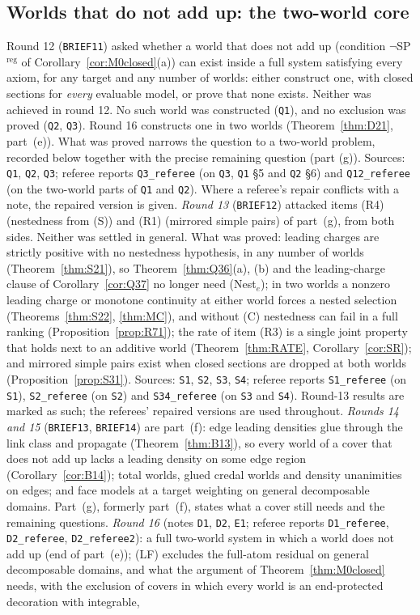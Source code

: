 \documentclass[11pt]{article}
\theoremstyle{definition}
\theoremstyle{remark}
\newcommand{\src}[1]{\texttt{#1}}
\begin{document}
\subsection{Worlds that do not add up: the two-world core}\label{sec:open-core}
Round 12 (\src{BRIEF11}) asked whether a world that does not add up (condition $\neg$SP$^{\mathrm{reg}}$ of Corollary~\ref{cor:M0closed}(a)) can exist inside a full system satisfying every axiom, for any target and any number of worlds: either construct one, with closed sections for \emph{every} evaluable model, or prove that none exists. Neither was achieved in round 12. No such world was constructed (\src{Q1}), and no exclusion was proved (\src{Q2}, \src{Q3}). Round 16 constructs one in two worlds (Theorem~\ref{thm:D21}, part~(e)). What was proved narrows the question to a two-world problem, recorded below together with the precise remaining question (part (g)). Sources: \src{Q1}, \src{Q2}, \src{Q3}; referee reports \src{Q3\_referee} (on \src{Q3}, \src{Q1} \S5 and \src{Q2} \S6) and \src{Q12\_referee} (on the two-world parts of \src{Q1} and \src{Q2}). Where a referee's repair conflicts with a note, the repaired version is given. \emph{Round 13} (\src{BRIEF12}) attacked items (R4) (nestedness from (S)) and (R1) (mirrored simple pairs) of part~(g), from both sides. Neither was settled in general. What was proved: leading charges are strictly positive with no nestedness hypothesis, in any number of worlds (Theorem~\ref{thm:S21}), so Theorem~\ref{thm:Q36}(a), (b) and the leading-charge clause of Corollary~\ref{cor:Q37} no longer need (Nest$_e$); in two worlds a nonzero leading charge or monotone continuity at either world forces a nested selection (Theorems~\ref{thm:S22}, \ref{thm:MC}), and without (C) nestedness can fail in a full ranking (Proposition~\ref{prop:R71}); the rate of item (R3) is a single joint property that holds next to an additive world (Theorem~\ref{thm:RATE}, Corollary~\ref{cor:SR}); and mirrored simple pairs exist when closed sections are dropped at both worlds (Proposition~\ref{prop:S31}). Sources: \src{S1}, \src{S2}, \src{S3}, \src{S4}; referee reports \src{S1\_referee} (on \src{S1}), \src{S2\_referee} (on \src{S2}) and \src{S34\_referee} (on \src{S3} and \src{S4}). Round-13 results are marked as such; the referees' repaired versions are used throughout. \emph{Rounds 14 and 15} (\src{BRIEF13}, \src{BRIEF14}) are part~(f): edge leading densities glue through the link class and propagate (Theorem~\ref{thm:B13}), so every world of a cover that does not add up lacks a leading density on some edge region (Corollary~\ref{cor:B14}); total worlds, glued credal worlds and density unanimities on edges; and face models at a target weighting on general decomposable domains. Part~(g), formerly part~(f), states what a cover still needs and the remaining questions. \emph{Round 16} (notes \src{D1}, \src{D2}, \src{E1}; referee reports \src{D1\_referee}, \src{D2\_referee}, \src{D2\_referee2}): a full two-world system in which a world does not add up (end of part~(e)); (LF) excludes the full-atom residual on general decomposable domains, and what the argument of Theorem~\ref{thm:M0closed} needs, with the exclusion of covers in which every world is an end-protected decoration with integrable, 
\end{document}
